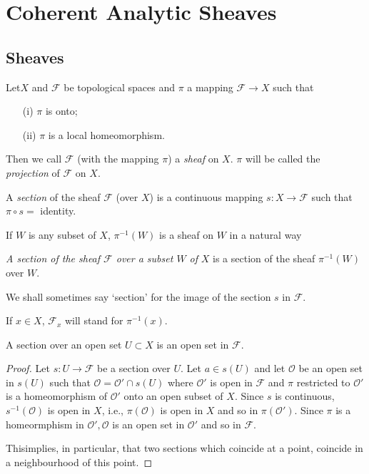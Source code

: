 \part{Coherent Analytic Sheaves}\label{part3}

\chapter{Sheaves}\label{chap11}

\begin{defi*}
Let\pageoriginale $X$ and $\mathscr{F}$ be topological spaces and
$\pi$ a mapping $\mathscr{F} \to X$ such that
\begin{itemize}
\item[(i)] $\pi$ is onto;

\item[(ii)] $\pi$ is a local homeomorphism.
\end{itemize}
Then we call $\mathscr{F}$ (with the mapping $\pi$) a \textit{sheaf}
on $X$. $\pi$ will be called the \textit{projection} of $\mathscr{F}$
on $X$.

A \textit{section} of the sheaf $\mathscr{F}$ (over $X$) is a
continuous mapping $s : X \to \mathscr{F}$ such that $\pi \circ s = $
identity.

If $W$ is any subset of $X$, $\pi^{-1} (W)$ is a sheaf on $W$ in a
natural way 

\textit{A section of the sheaf $\mathscr{F}$ over a subset $W$ of }
$X$ is a section of the sheaf $\pi^{-1}(W)$ over $W$. 

We shall sometimes say `section' for the image of the section $s$ in
$\mathscr{F}$. 

If $x \in X$, $\mathscr{F}_x$ will stand for $\pi^{-1} (x)$. 
\end{defi*}

\setcounter{proposition}{0}
\begin{proposition}\label{chap11:prop1}
A section over an open set $U \subset X$ is an open set in
$\mathscr{F}$. 
\end{proposition}

\begin{proof}
Let $s : U \to \mathscr{F}$ be a section over $U$. Let $a \in s(U)$
and let $\mathscr{O}$ be an open set in $s(U)$ such that $\mathscr{O}
= \mathscr{O}' \cap s (U)$ where $\mathscr{O}'$ is open in
$\mathscr{F}$ and $\pi$ restricted to $\mathscr{O}'$ is a
homeomorphism of $\mathscr{O}'$ onto an open subset of $X$. Since
$s$ is continuous, $s^{-1}(\mathscr{O})$ is open in $X$, i.e., $\pi
(\mathscr{O})$ is open in $X$ and so in $\pi(\mathscr{O}')$. Since
$\pi$ is a homeormphism in $\mathscr{O}', \mathscr{O}$ is an open set
in $\mathscr{O}'$ and so in $\mathscr{F}$. 

This\pageoriginale implies, in particular, that two sections which
coincide at a point, coincide in a neighbourhood of this point. 
\end{proof}

